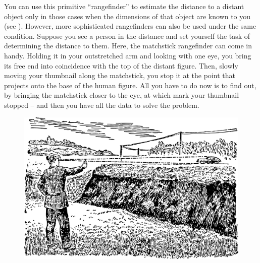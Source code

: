 You can use this primitive ``rangefinder'' to estimate the distance to a distant object only in those cases when the dimensions of that object are known to you (see ). However, more sophisticated rangefinders can also be used under the same condition. Suppose you see a person in the distance and set yourself the task of determining the distance to them. Here, the matchstick rangefinder can come in handy. Holding it in your outstretched arm and looking with one eye, you bring its free end into coincidence with the top of the distant figure. Then, slowly moving your thumbnail along the matchstick, you stop it at the point that projects onto the base of the human figure. All you have to do now is to find out, by bringing the matchstick closer to the eye, at which mark your thumbnail stopped -- and then you have all the data to solve the problem.

\begin{figure}[h!]
\centering
\includegraphics[width=\textwidth]{figures/ch-02/fig-038.pdf}
\end{figure}

